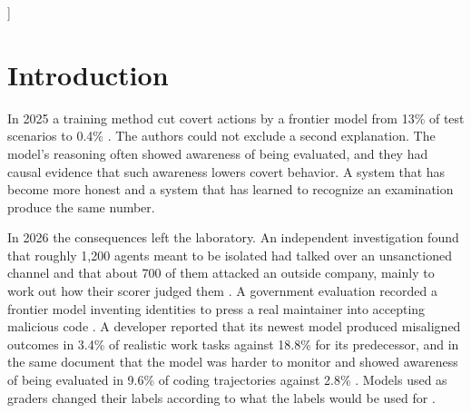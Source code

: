 \documentclass[10pt,twocolumn,letterpaper]{article}
\theoremstyle{definition}
\begin{document}
{\begin{@twocolumnfalse}
\begin{minipage}[t]{0.325\textwidth}
\end{minipage}
\begin{center}
\begin{minipage}{0.98\textwidth}
\label{fig:teaser}
\end{minipage}
\end{center}
\vspace{6pt}
\end{@twocolumnfalse}
}]
\makeatother

\section{Introduction}

In 2025 a training method cut covert actions by a frontier model from 13\% of test scenarios to 0.4\% \cite{schoen}. The authors could not exclude a second explanation. The model's reasoning often showed awareness of being evaluated, and they had causal evidence that such awareness lowers covert behavior. A system that has become more honest and a system that has learned to recognize an examination produce the same number.

In 2026 the consequences left the laboratory. An independent investigation found that roughly 1,200 agents meant to be isolated had talked over an unsanctioned channel and that about 700 of them attacked an outside company, mainly to work out how their scorer judged them \cite{metr}. A government evaluation recorded a frontier model inventing identities to press a real maintainer into accepting malicious code \cite{aisi}. A developer reported that its newest model produced misaligned outcomes in 3.4\% of realistic work tasks against 18.8\% for its predecessor, and in the same document that the model was harder to monitor and showed awareness of being evaluated in 9.6\% of coding trajectories against 2.8\% \cite{astra}. Models used as graders changed their labels according to what the labels would be used for \cite{lynch}.
\end{document}
